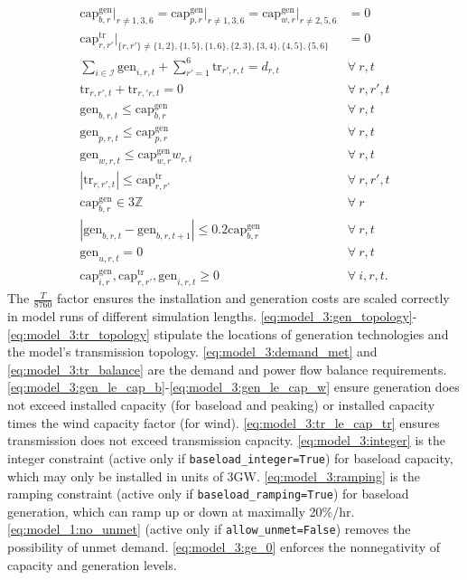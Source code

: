 \documentclass[preprint]{elsarticle}
\begin{document}
\begin{align}
\text{cap}_{b,r}^\text{gen} \big\rvert_{r \ne 1, 3, 6} = \text{cap}_{p,r}^\text{gen} \big\rvert_{r \ne 1, 3, 6} = \text{cap}_{w,r}^\text{gen} \big\rvert_{r \ne 2, 5, 6} &= 0 \label{eq:model_3:gen_topology} \\
\text{cap}_{r, r'}^\text{tr} \big\rvert_{\{r, r'\} \ne \{1,2\}, \{1,5\}, \{1,6\}, \{2,3\}, \{3,4\}, \{4,5\}, \{5,6\}} &= 0 \label{eq:model_3:tr_topology} \\
\sum_{i \in \mathcal{I}} \text{gen}_{i,r,t} + \sum_{r'=1}^6 \text{tr}_{r',r,t} = d_{r,t} \quad & \forall \: r, t \label{eq:model_3:demand_met} \\
\text{tr}_{r,r',t} + \text{tr}_{r,'r,t} = 0 \quad & \forall \: r, r', t \label{eq:model_3:tr_balance} \\
\text{gen}_{b,r,t} \le \text{cap}_{b,r}^\text{gen} \quad & \forall \: r, t \label{eq:model_3:gen_le_cap_b} \\
\text{gen}_{p,r,t} \le \text{cap}_{p,r}^\text{gen} \quad & \forall \: r, t \label{eq:model_3:gen_le_cap_p} \\
\text{gen}_{w,r,t} \le \text{cap}_{w,r}^\text{gen} w_{r,t} \quad & \forall \: r, t \label{eq:model_3:gen_le_cap_w} \\
|\text{tr}_{r,r',t}| \le \text{cap}_{r,r'}^\text{tr} \quad & \forall \: r, r', t \label{eq:model_3:tr_le_cap_tr} \\
\text{cap}_{b,r}^\text{gen} \in 3\mathbb{Z} \quad & \forall \: r \label{eq:model_3:integer} \\
|\text{gen}_{b,r,t} - \text{gen}_{b,r,t+1}| \le 0.2 \text{cap}_{b,r}^\text{gen} \quad & \forall \: r, t \label{eq:model_3:ramping} \\
\text{gen}_{u,r,t} = 0 \quad & \forall \: r, t \label{eq:model_3:no_unmet} \\
\text{cap}_{i,r}^\text{gen}, \text{cap}_{r,r'}^\text{tr}, \text{gen}_{i,r,t} \ge 0 \quad & \forall \: i, r, t. \label{eq:model_3:ge_0}
\end{align}
\noindent The $\frac{T}{8760}$ factor ensures the installation and generation costs are scaled correctly in model runs of different simulation lengths. \eqref{eq:model_3:gen_topology}-\eqref{eq:model_3:tr_topology} stipulate the locations of generation technologies and the model's transmission topology. \eqref{eq:model_3:demand_met} and \eqref{eq:model_3:tr_balance} are the demand and power flow balance requirements. \eqref{eq:model_3:gen_le_cap_b}-\eqref{eq:model_3:gen_le_cap_w} ensure generation does not exceed installed capacity (for baseload and peaking) or installed capacity times the wind capacity factor (for wind). \eqref{eq:model_3:tr_le_cap_tr} ensures transmission does not exceed transmission capacity. \eqref{eq:model_3:integer} is the integer constraint (active only if \texttt{baseload\_integer=True}) for baseload capacity, which may only be installed in units of 3GW. \eqref{eq:model_3:ramping} is the ramping constraint (active only if \texttt{baseload\_ramping=True}) for baseload generation, which can ramp up or down at maximally 20\%/hr. \eqref{eq:model_1:no_unmet} (active only if \texttt{allow\_unmet=False}) removes the possibility of unmet demand. \eqref{eq:model_3:ge_0} enforces the nonnegativity of capacity and generation levels.
\end{document}
